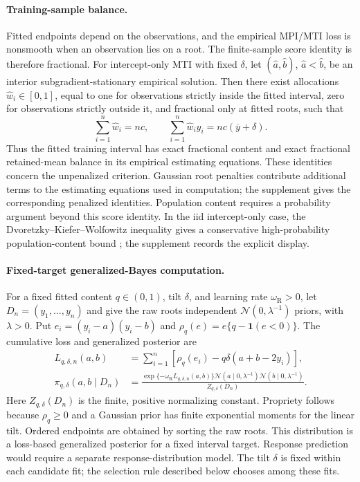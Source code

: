 \documentclass[11pt]{article}
\numberwithin{equation}{section}
\newcommand{\Normal}{\mathcal{N}}
\newcommand{\ind}{\mathbf{1}}
\begin{document}
\paragraph{Training-sample balance.}
Fitted endpoints depend on the observations, and the empirical MPI/MTI loss is
nonsmooth when an observation lies on a root. The finite-sample score identity is
therefore fractional. For intercept-only MTI with fixed \(\delta\), let
\((\widehat a,\widehat b)\), \(\widehat a<\widehat b\), be an interior
subgradient-stationary empirical solution. Then there exist allocations
\(\widehat w_i\in[0,1]\), equal to one for observations strictly inside the
fitted interval, zero for observations strictly outside it, and fractional only
at fitted roots, such that
\[
\sum_{i=1}^n \widehat w_i=nc,
\qquad
\sum_{i=1}^n \widehat w_i y_i
=nc(\overline y+\delta).
\]
Thus the fitted training interval has exact fractional content and exact
fractional retained-mean balance in its empirical estimating equations.
These identities concern the unpenalized criterion. Gaussian root penalties
contribute additional terms to the estimating equations used in computation;
the supplement gives the corresponding penalized identities.
Population content requires a probability argument beyond this score identity.
In the iid intercept-only case, the Dvoretzky--Kiefer--Wolfowitz inequality gives
a conservative high-probability population-content bound
\citep{Massart1990DKW}; the supplement records
the explicit display.

\paragraph{Fixed-target generalized-Bayes computation.}
For a fixed fitted content \(q\in(0,1)\), tilt \(\delta\), and learning rate
\(\omega_{\mathrm R}>0\), let \(D_n=(y_1,\ldots,y_n)\) and give the raw
roots independent \(\Normal(0,\lambda^{-1})\) priors, with \(\lambda>0\).
Put \(e_i=(y_i-a)(y_i-b)\) and
\(\rho_q(e)=e\{q-\ind(e<0)\}\). The cumulative loss and generalized
posterior are
\begin{align}
L_{q,\delta,n}(a,b)
&=\sum_{i=1}^n\left[\rho_q(e_i)-q\delta(a+b-2y_i)\right],
\label{eq:mti-computational-loss}\\
\pi_{q,\delta}(a,b\mid D_n)
&=\frac{\exp\{-\omega_{\mathrm R}L_{q,\delta,n}(a,b)\}
\Normal(a\mid0,\lambda^{-1})\Normal(b\mid0,\lambda^{-1})}
{Z_{q,\delta}(D_n)}.
\label{eq:mti-generalized-posterior}
\end{align}
Here \(Z_{q,\delta}(D_n)\) is the finite, positive normalizing constant.
Propriety follows because \(\rho_q\ge0\) and a Gaussian prior has finite
exponential moments for the linear tilt. Ordered endpoints are obtained by
sorting the raw roots. This distribution is a
loss-based generalized posterior for a fixed interval target. Response
prediction would require a separate response-distribution model. The tilt
\(\delta\) is fixed within each candidate fit; the selection rule
described below chooses among these fits.
\end{document}
